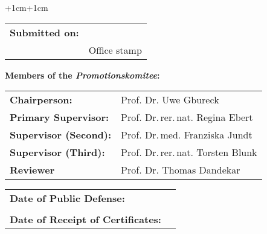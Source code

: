 


\vspace*{\fill} %

\thispagestyle{empty} %

\begin{adjustwidth}{+1cm}{+1cm} %

    \noindent
    \begin{tabular}{l l}
        \textbf{Submitted on:} & \dotuline{\hspace{10cm}} \\
                               & {\small Office stamp}    \\
    \end{tabular}


    \vspace{\vdouble}
    {\noindent\large \textbf{Members of the \textit{Promotionskomitee}:}}

    \vspace{\vhalf}
    \begin{tabular}{l l}
        \textbf{Chairperson:}         & Prof. Dr. Uwe Gbureck               \\
        \textbf{Primary Supervisor:}  & Prof. Dr.\,rer.\,nat. Regina Ebert  \\
        \textbf{Supervisor (Second):} & Prof. Dr.\,med. Franziska Jundt     \\
        \textbf{Supervisor (Third):}  & Prof. Dr.\,rer.\,nat. Torsten Blunk \\
        \textbf{Reviewer}             & Prof. Dr. Thomas Dandekar         \\
    \end{tabular}


    \vspace{\vdouble}
    \noindent
    \begin{tabular}{l l}
        \textbf{Date of Public Defense:}          & \dotuline{\hspace{6.45cm}} \\
                                                  &                            \\
        \textbf{Date of Receipt of Certificates:} & \dotuline{\hspace{6.45cm}} \\
    \end{tabular}

\end{adjustwidth}

